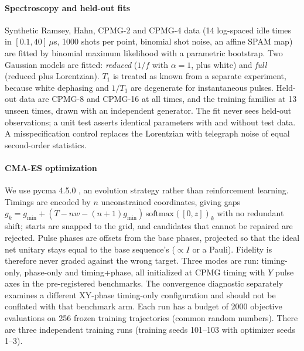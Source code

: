 \paragraph{Spectroscopy and held-out fits} Synthetic Ramsey, Hahn, CPMG-2 and CPMG-4 data
(14 log-spaced idle times in $[0.1,40]\,\mu$s, 1000 shots per point, binomial shot noise, an
affine SPAM map) are fitted by binomial maximum likelihood with a parametric bootstrap.
Two Gaussian models are fitted: \emph{reduced} ($1/f$ with $\alpha=1$, plus white) and
\emph{full} (reduced plus Lorentzian). $T_1$ is treated as known from a separate experiment,
because white dephasing and $1/T_1$ are degenerate for instantaneous pulses. Held-out data are
CPMG-8 and CPMG-16 at all times, and the training families at 13 unseen times, drawn with an
independent generator. The fit never sees held-out observations; a unit test asserts identical
parameters with and without test data. A misspecification control replaces the Lorentzian
with telegraph noise of equal second-order statistics.

\paragraph{CMA-ES optimization} We use pycma 4.5.0 \citep{Hansen2016}, an evolution
strategy rather than reinforcement learning. Timings are encoded by $n$ unconstrained
coordinates, giving gaps $g_k=g_{\min}+(T-nw-(n+1)g_{\min})\,\mathrm{softmax}([0,z])_k$ with no
redundant shift; starts are snapped to the grid, and candidates that cannot be repaired are
rejected. Pulse phases are offsets from the base phases, projected so that the ideal net unitary
stays equal to the base sequence's ($\propto I$ or a Pauli). Fidelity is therefore never graded
against the wrong target. Three modes are run: timing-only, phase-only and timing+phase, all initialized
at CPMG timing with $Y$ pulse axes in the pre-registered benchmarks.
The convergence diagnostic separately examines a different XY-phase timing-only
configuration and should not be conflated with that benchmark arm. Each run has a budget of 2000 objective evaluations on
256 frozen training trajectories (common random numbers). There are three independent training
runs (training seeds 101--103 with optimizer seeds 1--3).

